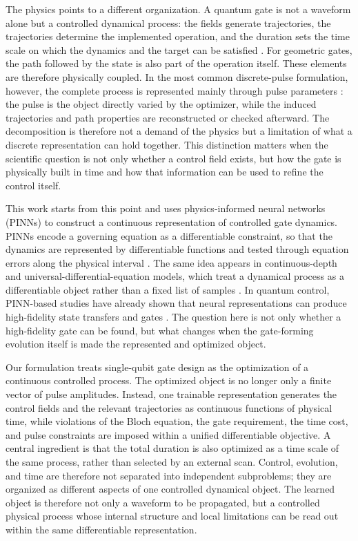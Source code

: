 \documentclass[aps,prx,reprint,superscriptaddress,nofootinbib,longbibliography,floatfix,showkeys]{revtex4-2}
\begin{document}
The physics points to a different organization.  A quantum gate is not a
waveform alone but a controlled dynamical process: the fields generate
trajectories, the trajectories determine the implemented operation, and the
duration sets the time scale on which the dynamics and the target can be
satisfied
\cite{Peirce1988QuantumOCT,Ramakrishna1995Controllability}.  For geometric
gates, the path followed by the state is also part of the operation itself.
These elements are therefore physically coupled.  In the most common
discrete-pulse formulation, however, the complete process is represented
mainly through pulse parameters
\cite{Khaneja2005GRAPE,Caneva2011CRAB,Machnes2018GOAT}: the pulse is the
object directly varied by the optimizer, while the induced trajectories and
path properties are reconstructed or checked afterward.  The decomposition
is therefore not a demand of the physics but a limitation of what a discrete
representation can hold together.  This distinction matters when the
scientific question is not only whether a control field exists, but how the
gate is physically built in time and how that information can be used to
refine the control itself.

This work starts from this point and uses physics-informed neural networks
(PINNs) to construct a continuous representation of controlled gate
dynamics.  PINNs encode a governing equation as a differentiable constraint,
so that the dynamics are represented by differentiable functions and tested
through equation errors along the physical interval
\cite{Raissi2019PINN,Karniadakis2021PIML,Cuomo2022PINNReview}.  The same
idea appears in continuous-depth and universal-differential-equation models,
which treat a dynamical process as a differentiable object rather than a
fixed list of samples \cite{Chen2018NeuralODE,Rackauckas2020UDE}.  In
quantum control, PINN-based studies have already shown that neural
representations can produce high-fidelity state transfers and gates
\cite{Guengordu2022SmoothPINNGates,Norambuena2024PINNQuantumControl,Lauten2025GateDesign,Ullah2024QuantumDissipative}.
The question here is not only whether a high-fidelity gate can be found, but
what changes when the gate-forming evolution itself is made the represented
and optimized object.

Our formulation treats single-qubit gate design as the optimization of a
continuous controlled process.  The optimized object is no longer only a
finite vector of pulse amplitudes.  Instead, one trainable representation
generates the control fields and the relevant trajectories as continuous
functions of physical time, while violations of the Bloch equation, the gate
requirement, the time cost, and pulse constraints are imposed within a
unified differentiable objective.  A central ingredient is that the total
duration is also optimized as a time scale of the same process, rather than
selected by an external scan.  Control, evolution, and time are therefore
not separated into independent subproblems; they are organized as different
aspects of one controlled dynamical object.  The learned object is therefore
not only a waveform to be propagated, but a controlled physical process
whose internal structure and local limitations can be read out within the
same differentiable representation.
\end{document}
